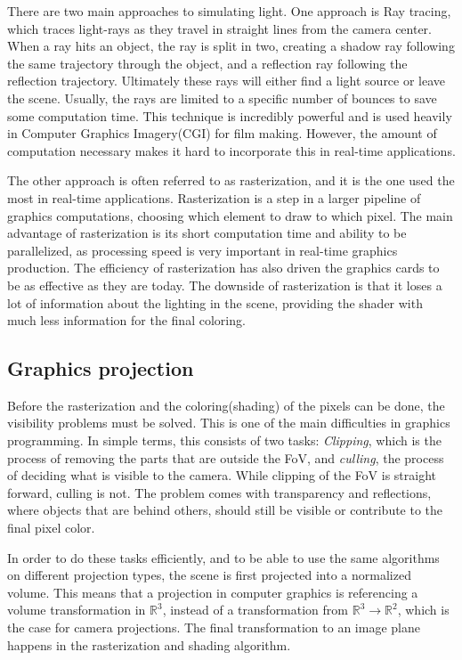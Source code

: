 There are two main approaches to simulating light. One approach is Ray tracing, which traces light-rays as they travel in straight lines from the camera center. When a ray hits an object, the ray is split in two, creating a shadow ray following the same trajectory through the object, and a reflection ray following the reflection trajectory. Ultimately these rays will either find a light source or leave the scene. Usually, the rays are limited to a specific number of bounces to save some computation time. This technique is incredibly powerful and is used heavily in Computer Graphics Imagery(CGI) for film making. However, the amount of computation necessary makes it hard to incorporate this in real-time applications.

The other approach is often referred to as rasterization, and it is the one used the most in real-time applications. Rasterization is a step in a larger pipeline of graphics computations, choosing which element to draw to which pixel. The main advantage of rasterization is its short computation time and ability to be parallelized, as processing speed is very important in real-time graphics production. The efficiency of rasterization has also driven the graphics cards to be as effective as they are today. The downside of rasterization is that it loses a lot of information about the lighting in the scene, providing the shader with much less information for the final coloring.

\subsection{Graphics projection}

Before the rasterization and the coloring(shading) of the pixels can be done, the visibility problems must be solved. This is one of the main difficulties in graphics programming. In simple terms, this consists of two tasks: \emph{Clipping}, which is the process of removing the parts that are outside the FoV, and \emph{culling}, the process of deciding what is visible to the camera. While clipping of the FoV is straight forward, culling is not. The problem comes with transparency and reflections, where objects that are behind others, should still be visible or contribute to the final pixel color. 

In order to do these tasks efficiently, and to be able to use the same algorithms on different projection types, the scene is first projected into a normalized volume. This means that a projection in computer graphics is referencing a volume transformation in $\mathbb{R}^3$, instead of a transformation from $\mathbb{R}^3 \rightarrow \mathbb{R}^2$, which is the case for camera projections. The final transformation to an image plane happens in the rasterization and shading algorithm.

